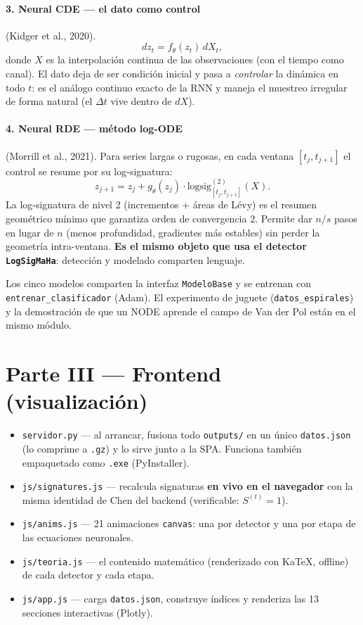 \documentclass[11pt,a4paper]{article}
\begin{document}
\paragraph{3. Neural CDE --- el dato como control} (Kidger et al., 2020).
\[ dz_t = f_\theta(z_t)\,dX_t, \]
donde $X$ es la interpolación continua de las observaciones (con el tiempo como
canal). El dato deja de ser condición inicial y pasa a \emph{controlar} la
dinámica en todo $t$: es el análogo continuo exacto de la RNN y maneja el
muestreo irregular de forma natural (el $\Delta t$ vive dentro de $dX$).

\paragraph{4. Neural RDE --- método log-ODE} (Morrill et al., 2021).
Para series largas o rugosas, en cada ventana $[t_j,t_{j+1}]$ el control se
resume por su log-signatura:
\[ z_{j+1} = z_j + g_\theta(z_j)\cdot \mathrm{logsig}^{(2)}_{[t_j,t_{j+1}]}(X). \]
La log-signatura de nivel 2 (incrementos $+$ áreas de Lévy) es el resumen
geométrico mínimo que garantiza orden de convergencia 2. Permite dar $n/s$
pasos en lugar de $n$ (menos profundidad, gradientes más estables) sin perder
la geometría intra-ventana. \textbf{Es el mismo objeto que usa el detector
\texttt{LogSigMaHa}}: detección y modelado comparten lenguaje.

\noindent Los cinco modelos comparten la interfaz \texttt{ModeloBase} y se
entrenan con \texttt{entrenar\_clasificador} (Adam). El experimento de juguete
(\texttt{datos\_espirales}) y la demostración de que un NODE aprende el campo de
Van der Pol están en el mismo módulo.

\section{Parte III — Frontend (visualización)}

\begin{itemize}[leftmargin=1.6em]
\item \texttt{servidor.py} --- al arrancar, fusiona todo \texttt{outputs/} en un
  único \texttt{datos.json} (lo comprime a \texttt{.gz}) y lo sirve junto a la
  SPA. Funciona también empaquetado como \texttt{.exe} (PyInstaller).
\item \texttt{js/signatures.js} --- recalcula signaturas \textbf{en vivo en el
  navegador} con la misma identidad de Chen del backend (verificable:
  $S^{(t)}=1$).
\item \texttt{js/anims.js} --- 21 animaciones \texttt{canvas}: una por detector
  y una por etapa de las ecuaciones neuronales.
\item \texttt{js/teoria.js} --- el contenido matemático (renderizado con KaTeX,
  offline) de cada detector y cada etapa.
\item \texttt{js/app.js} --- carga \texttt{datos.json}, construye índices y
  renderiza las 13 secciones interactivas (Plotly).
\end{itemize}
\end{document}
